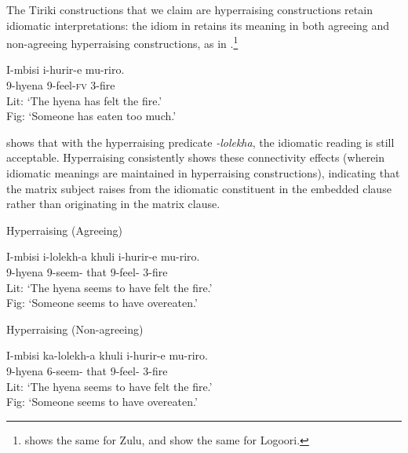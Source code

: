 \documentclass[output=paper,colorlinks,citecolor=brown
]{langscibook}
\begin{document}
\noindent The Tiriki constructions that we claim are hyperraising constructions retain idiomatic interpretations: the idiom in  retains its meaning in both agreeing and non-agreeing hyperraising constructions, as in .\footnote{\citet{Halpert2019RaisingUnphased} shows the same for Zulu, and \citet{diercksetal2022luyia} show the same for Logoori.} 

 

\ea \label{ex:johnson:Idiom}


\gll I-mbisi i-hurir-e mu-riro.\\
9-hyena 9\Sm-feel-\textsc{fv} 3-fire\\
\glt Lit: `The hyena has felt the fire.'\\
Fig: `Someone has eaten too much.'

\citep[99]{diercksetal2022luyia}
\z

 shows that with the hyperraising predicate \textit{-lolekha}, the idiomatic reading is still acceptable. Hyperraising consistently shows these connectivity effects (wherein idiomatic meanings are maintained in hyperraising constructions), indicating that the matrix subject raises from the idiomatic constituent in the embedded clause rather than originating in the matrix clause.



\ea \label{ex:johnson:TirikiIdiomsHr}
\begin{xlist}

\ex \label{ex:johnson:AgreeingHRIdiom}
{{Hyperraising (Agreeing)}}

\gll I-mbisi i-lolekh-a khuli i-hurir-e mu-riro.\\
9-hyena 9\Sm-seem-\Fv{} that 9\Sm-feel-\Fv{} 3-fire\\
\glt Lit: `The hyena seems to have felt the fire.'\\
Fig: `Someone seems to have overeaten.' 

\ex \label{ex:johnson:NonAgreeingHRIdiom}
{{Hyperraising (Non-agreeing)}}

\gll I-mbisi ka-lolekh-a khuli i-hurir-e mu-riro.\\
9-hyena 6\Sm-seem-\Fv{} that 9\Sm-feel-\Fv{} 3-fire\\
\glt Lit: `The hyena seems to have felt the fire.'\\
Fig: `Someone seems to have overeaten.' 

\end{xlist}
\z 
\end{document}
